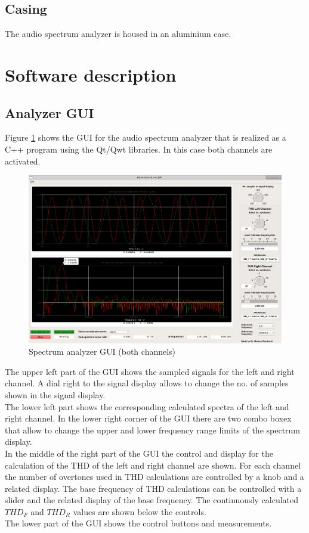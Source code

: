 \documentclass[11pt, oneside]{scrartcl}   	%
\begin{document}
\subsection{Casing}
The audio spectrum analyzer is housed in an aluminium case.

\newpage
\section{Software description}
\subsection{Analyzer GUI}
Figure \ref{fig:SpectrumAnalyzerGUI} shows the GUI for the audio spectrum analyzer that is realized as a C++  program using the Qt/Qwt libraries. In this case both channels are activated.
\begin{figure}[tbph]
	\centering
	\includegraphics[width=\linewidth]{MyAudioSpectrumAnalyzerGUI.png}
	\caption[Spectrum analyzer GUI (both channels)]{Spectrum analyzer GUI (both channels)}
	\label{fig:SpectrumAnalyzerGUI}
\end{figure}

The upper left part of the GUI shows the sampled signals for the left and right channel. A dial right to the signal display allows to change the no. of samples shown in the signal display.\\
The lower left part shows the corresponding calculated spectra of the left and right channel. In the lower right corner of the GUI there are two combo boxex that allow to change the upper and lower frequency range limits of the spectrum display.\\
In the middle of the right part of the GUI the control and display for the calculation of the THD of the left and right channel are shown. For each channel the number of overtones used in THD calculations are controlled by a knob and a related display. The base frequency of THD calculations can be controlled with a slider and the related display of the base frequency. The continuously calculated $THD_F$ and $THD_R$ values are shown below the controls. \\
The lower part of the GUI shows the control buttons and measurements.\\
\end{document}
